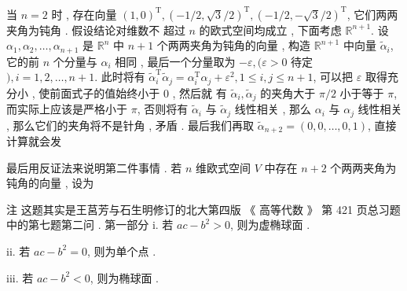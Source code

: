 \documentclass[10pt]{article}
\begin{document}
 当  $n=2$  时 ,  存在向量  $(1,0)^{\mathrm{T}},(-1 / 2, \sqrt{3} / 2)^{\mathrm{T}},(-1 / 2,-\sqrt{3} / 2)^{\mathrm{T}}$,  它们两两夹角为钝角 .  假设结论对维数不   超过  $n$  的欧式空间均成立 ,  下面考虑  $\mathbb{R}^{n+1}$.  设  $\alpha_{1}, \alpha_{2}, \ldots, \alpha_{n+1}$  是  $\mathbb{R}^{n}$  中  $n+1$  个两两夹角为钝角的向量 ,  构造  $\mathbb{R}^{n+1}$  中向量  $\tilde{\alpha}_{i}$,  它的前  $n$  个分量与  $\alpha_{i}$  相同 ,  最后一个分量取为  $-\varepsilon,(\varepsilon>0$  待定  $), i=1,2, \ldots, n+1$.  此时将有  $\tilde{\alpha}_{i}^{\mathrm{T}} \tilde{\alpha}_{j}=\alpha_{i}^{\mathrm{T}} \alpha_{j}+\varepsilon^{2}, 1 \leqslant i, j \leqslant n+1$,  可以把  $\varepsilon$  取得充分小 ,  使前面式子的值始终小于  0 ,  然后就   有  $\tilde{\alpha}_{i}, \tilde{\alpha}_{j}$  的夹角大于  $\pi / 2$  小于等于  $\pi$,  而实际上应该是严格小于  $\pi$,  否则将有  $\tilde{\alpha}_{i}$  与  $\tilde{\alpha}_{j}$  线性相关 ,  那么  $\alpha_{i}$  与  $\alpha_{j}$  线性相关 ,  那么它们的夹角将不是针角 ,  矛盾 .  最后我们再取  $\tilde{\alpha}_{n+2}=(0,0, \ldots, 0,1)$,  直接计算就会发 

 最后用反证法来说明第二件事情 .  若  $n$  维欧式空间  $V$  中存在  $n+2$  个两两夹角为钝角的向量 ,  设为 

 注   这题其实是王莒芳与石生明修订的北大第四版 《 高等代数 》 第  421  页总习题中的第七题第二问 .  第一部分  i.  若  $a c-b^{2}>0$,  则为虚椭球面 .

ii.  若  $a c-b^{2}=0$,  则为单个点 .

iii.  若  $a c-b^{2}<0$,  则为椭球面 .
\end{document}
